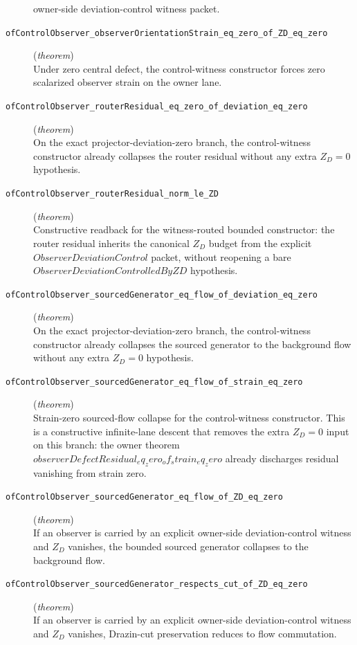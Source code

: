 \documentclass[11pt,a4paper]{article}
\begin{document}
\begin{description}
owner-side deviation-control witness packet.
  \item[\texttt{ofControlObserver\_observerOrientationStrain\_eq\_zero\_of\_ZD\_eq\_zero}] (\textit{theorem}) \\ Under zero central defect, the control-witness constructor forces zero scalarized 
observer strain on the owner lane.
  \item[\texttt{ofControlObserver\_routerResidual\_eq\_zero\_of\_deviation\_eq\_zero}] (\textit{theorem}) \\ On the exact projector-deviation-zero branch, the control-witness constructor 
already collapses the router residual without any extra $Z_D = 0$ hypothesis.
  \item[\texttt{ofControlObserver\_routerResidual\_norm\_le\_ZD}] (\textit{theorem}) \\ Constructive readback for the witness-routed bounded constructor: the router residual 
inherits the canonical $Z_D$ budget from the explicit $ObserverDeviationControl$ 
packet, without reopening a bare $ObserverDeviationControlledByZD$ hypothesis.
  \item[\texttt{ofControlObserver\_sourcedGenerator\_eq\_flow\_of\_deviation\_eq\_zero}] (\textit{theorem}) \\ On the exact projector-deviation-zero branch, the control-witness constructor 
already collapses the sourced generator to the background flow without any extra 
$Z_D = 0$ hypothesis.
  \item[\texttt{ofControlObserver\_sourcedGenerator\_eq\_flow\_of\_strain\_eq\_zero}] (\textit{theorem}) \\ Strain-zero sourced-flow collapse for the control-witness constructor. 
This is a constructive infinite-lane descent that removes the extra $Z_D = 0$ 
input on this branch: the owner theorem 
$observerDefectResidual_eq_zero_of_strain_eq_zero$ already discharges residual 
vanishing from strain zero.
  \item[\texttt{ofControlObserver\_sourcedGenerator\_eq\_flow\_of\_ZD\_eq\_zero}] (\textit{theorem}) \\ If an observer is carried by an explicit owner-side deviation-control witness and 
$Z_D$ vanishes, the bounded sourced generator collapses to the background flow.
  \item[\texttt{ofControlObserver\_sourcedGenerator\_respects\_cut\_of\_ZD\_eq\_zero}] (\textit{theorem}) \\ If an observer is carried by an explicit owner-side deviation-control witness and 
$Z_D$ vanishes, Drazin-cut preservation reduces to flow commutation.

\end{description}
\end{document}

